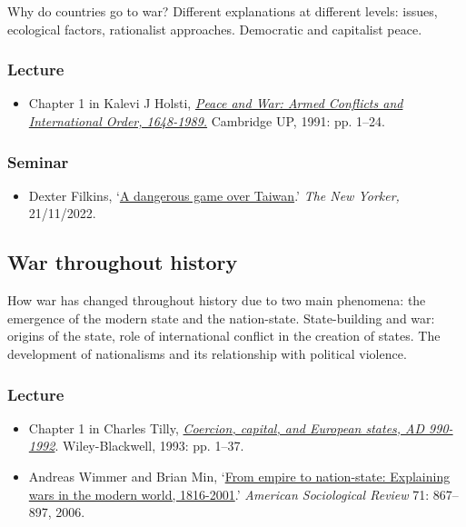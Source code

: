 \documentclass[12pt, a4paper]{article}
\begin{document}
Why do countries go to war? Different explanations at different levels: issues, ecological factors, rationalist approaches. Democratic and capitalist peace.

\subsubsection*{Lecture}

\begin{itemize}
\setlength\itemsep{0pt}
\item Chapter 1 in Kalevi J Holsti, \href{https://doi.org/10.1017/CBO9780511628290}{\textit{Peace and War: Armed Conflicts and International Order, 1648-1989.}} Cambridge UP, 1991: pp. 1--24.
\end{itemize}

\subsubsection*{Seminar}

\begin{itemize}
\setlength\itemsep{0pt}
\item Dexter Filkins, `\href{https://www.newyorker.com/magazine/2022/11/21/a-dangerous-game-over-taiwan}{A dangerous game over Taiwan}.' \textit{The New Yorker,} 21/11/2022.
\end{itemize}

\hline %

\subsection{War throughout history}\label{war_history}

How war has changed throughout history due to two main phenomena: the emergence of the modern state and the nation-state. State-building and war: origins of the state, role of international conflict in the creation of states. The development of nationalisms and its relationship with political violence.

\subsubsection*{Lecture}

\begin{itemize}
\setlength\itemsep{0pt}
\item Chapter 1 in Charles Tilly, \href{https://www.wiley.com/en-us/Coercion%2C+Capital+and+European+States%2C+A+D+990+1992-p-9781557863683}{\textit{Coercion, capital, and European states, AD 990-1992}}. Wiley-Blackwell, 1993: pp. 1--37.
\item Andreas Wimmer and Brian Min, `\href{https://doi.org/10.1177/000312240607100601}{From empire to nation-state: Explaining wars in the modern world, 1816-2001}.' \textit{American Sociological Review} 71: 867--897, 2006.
\end{itemize}
\end{document}
